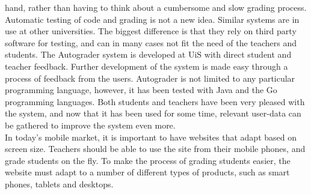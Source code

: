 hand, rather than having to think about a cumbersome and slow grading process. \\Automatic testing of code and grading is not a new idea. Similar systems are in use at other universities. The biggest difference is that they rely on third party software for testing, and can in many cases not fit the need of the teachers and students. The Autograder system is developed at UiS with direct student and teacher feedback. Further development of the system is made easy through a process of feedback from the users. Autograder is not limited to any particular programming language, however, it has been tested with Java and the Go programming languages. Both students and teachers have been very pleased with the system, and now that it has been used for some time, relevant user-data can be gathered to improve the system even more. \\In today's mobile market, it is important to have websites that adapt based on screen size. Teachers should be able to use the site from their mobile phones, and grade students on the fly. To make the process of grading students easier, the website must adapt to a number of different types of products, such as smart phones, tablets and desktops.
